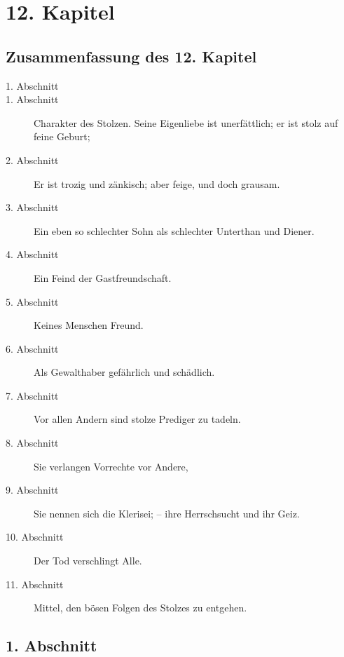 
\chapter{12. Kapitel} \label{kap12}

\section{Zusammenfassung des 12. Kapitel}
\small
\begin{description}
\item[1. Abschnitt]
\item[1. Abschnitt] Charakter des Stolzen. Seine Eigenliebe ist unerfättlich; er
ist stolz auf feine Geburt;
\item[2. Abschnitt] Er ist trozig und zänkisch; aber feige, und doch grausam.
\item[3. Abschnitt] Ein eben so schlechter Sohn als schlechter Unterthan und
Diener.
\item[4. Abschnitt] Ein Feind der Gastfreundschaft.
\item[5. Abschnitt] Keines Menschen Freund.
\item[6. Abschnitt] Als Gewalthaber gefährlich und schädlich.
\item[7. Abschnitt] Vor allen Andern sind stolze Prediger zu tadeln.
\item[8. Abschnitt] Sie verlangen Vorrechte vor Andere,
\item[9. Abschnitt] Sie nennen sich die Klerisei; -- ihre Herrschsucht und ihr
Geiz.
\item[10. Abschnitt] Der Tod verschlingt Alle.
\item[11. Abschnitt] Mittel, den bösen Folgen des Stolzes zu entgehen.
\end{description}
\normalsize

\section{1. Abschnitt}

